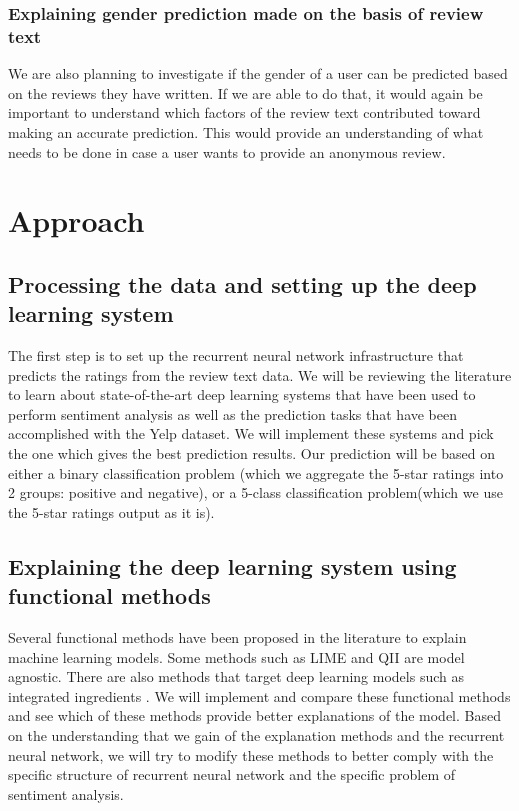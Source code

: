 \documentclass[11pt]{article}
\begin{document}
\subsubsection{Explaining gender prediction made on the basis of review text}

We are also planning to investigate if the gender of a user can be predicted based on the reviews they have written. If we are able to do that, it would again be important to understand which factors of the review text contributed toward making an accurate prediction. This would provide an understanding of what needs to be done in case a user wants to provide an anonymous review.

\section{Approach}

\subsection{Processing the data and setting up the deep learning system}
\label{step:rating-prediction}

The first step is to set up the recurrent neural network infrastructure \cite{Tang2015} that predicts the ratings from the review text data. We will be reviewing the literature to learn about state-of-the-art deep learning systems that have been used to perform sentiment analysis as well as the prediction tasks that have been accomplished with the Yelp dataset. We will implement these systems and pick the one which gives the best prediction results. Our prediction will be based on either a binary classification problem (which we aggregate the 5-star ratings into 2 groups: positive and negative), or a 5-class classification problem(which we use the 5-star ratings output as it is). 

\subsection{Explaining the deep learning system using functional methods}
\label{step:rating-prediction-explanation}

Several functional methods have been proposed in the literature to explain machine learning models. Some methods such as LIME \cite{Ribeiro2016} and QII \cite{Datta2017} are model agnostic. There are also methods that target deep learning models such as integrated ingredients \cite{Sundararajan2017}. We will implement and compare these functional methods and see which of these methods provide better explanations of the model. Based on the understanding that we gain of the explanation methods and the recurrent neural network, we will try to modify these methods to better comply with the specific structure of recurrent neural network and the specific problem of sentiment analysis.
\end{document}
